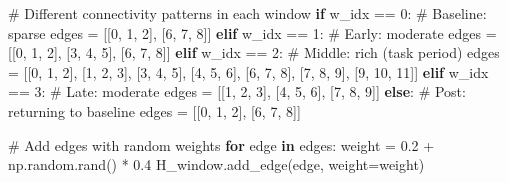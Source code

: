 \documentclass[
  11pt,
  letterpaper,
  oneside,
  openany]{book}
\newenvironment{Shaded}{\begin{snugshade}}{\end{snugshade}}
\newcommand{\CommentTok}[1]{\textcolor[rgb]{0.37,0.37,0.37}{#1}}
\newcommand{\ControlFlowTok}[1]{\textcolor[rgb]{0.00,0.23,0.31}{\textbf{#1}}}
\newcommand{\DecValTok}[1]{\textcolor[rgb]{0.68,0.00,0.00}{#1}}
\newcommand{\FloatTok}[1]{\textcolor[rgb]{0.68,0.00,0.00}{#1}}
\newcommand{\KeywordTok}[1]{\textcolor[rgb]{0.00,0.23,0.31}{\textbf{#1}}}
\newcommand{\NormalTok}[1]{\textcolor[rgb]{0.00,0.23,0.31}{#1}}
\newcommand{\OperatorTok}[1]{\textcolor[rgb]{0.37,0.37,0.37}{#1}}
\begin{document}
\begin{Shaded}
\begin{Highlighting}[]
    \CommentTok{\# Different connectivity patterns in each window}
    \ControlFlowTok{if}\NormalTok{ w\_idx }\OperatorTok{==} \DecValTok{0}\NormalTok{:  }\CommentTok{\# Baseline: sparse}
\NormalTok{        edges }\OperatorTok{=}\NormalTok{ [[}\DecValTok{0}\NormalTok{, }\DecValTok{1}\NormalTok{, }\DecValTok{2}\NormalTok{], [}\DecValTok{6}\NormalTok{, }\DecValTok{7}\NormalTok{, }\DecValTok{8}\NormalTok{]]}
    \ControlFlowTok{elif}\NormalTok{ w\_idx }\OperatorTok{==} \DecValTok{1}\NormalTok{:  }\CommentTok{\# Early: moderate}
\NormalTok{        edges }\OperatorTok{=}\NormalTok{ [[}\DecValTok{0}\NormalTok{, }\DecValTok{1}\NormalTok{, }\DecValTok{2}\NormalTok{], [}\DecValTok{3}\NormalTok{, }\DecValTok{4}\NormalTok{, }\DecValTok{5}\NormalTok{], [}\DecValTok{6}\NormalTok{, }\DecValTok{7}\NormalTok{, }\DecValTok{8}\NormalTok{]]}
    \ControlFlowTok{elif}\NormalTok{ w\_idx }\OperatorTok{==} \DecValTok{2}\NormalTok{:  }\CommentTok{\# Middle: rich (task period)}
\NormalTok{        edges }\OperatorTok{=}\NormalTok{ [[}\DecValTok{0}\NormalTok{, }\DecValTok{1}\NormalTok{, }\DecValTok{2}\NormalTok{], [}\DecValTok{1}\NormalTok{, }\DecValTok{2}\NormalTok{, }\DecValTok{3}\NormalTok{], [}\DecValTok{3}\NormalTok{, }\DecValTok{4}\NormalTok{, }\DecValTok{5}\NormalTok{], [}\DecValTok{4}\NormalTok{, }\DecValTok{5}\NormalTok{, }\DecValTok{6}\NormalTok{], }
\NormalTok{                [}\DecValTok{6}\NormalTok{, }\DecValTok{7}\NormalTok{, }\DecValTok{8}\NormalTok{], [}\DecValTok{7}\NormalTok{, }\DecValTok{8}\NormalTok{, }\DecValTok{9}\NormalTok{], [}\DecValTok{9}\NormalTok{, }\DecValTok{10}\NormalTok{, }\DecValTok{11}\NormalTok{]]}
    \ControlFlowTok{elif}\NormalTok{ w\_idx }\OperatorTok{==} \DecValTok{3}\NormalTok{:  }\CommentTok{\# Late: moderate  }
\NormalTok{        edges }\OperatorTok{=}\NormalTok{ [[}\DecValTok{1}\NormalTok{, }\DecValTok{2}\NormalTok{, }\DecValTok{3}\NormalTok{], [}\DecValTok{4}\NormalTok{, }\DecValTok{5}\NormalTok{, }\DecValTok{6}\NormalTok{], [}\DecValTok{7}\NormalTok{, }\DecValTok{8}\NormalTok{, }\DecValTok{9}\NormalTok{]]}
    \ControlFlowTok{else}\NormalTok{:  }\CommentTok{\# Post: returning to baseline}
\NormalTok{        edges }\OperatorTok{=}\NormalTok{ [[}\DecValTok{0}\NormalTok{, }\DecValTok{1}\NormalTok{, }\DecValTok{2}\NormalTok{], [}\DecValTok{6}\NormalTok{, }\DecValTok{7}\NormalTok{, }\DecValTok{8}\NormalTok{]]}
    
    \CommentTok{\# Add edges with random weights}
    \ControlFlowTok{for}\NormalTok{ edge }\KeywordTok{in}\NormalTok{ edges:}
\NormalTok{        weight }\OperatorTok{=} \FloatTok{0.2} \OperatorTok{+}\NormalTok{ np.random.rand() }\OperatorTok{*} \FloatTok{0.4}
\NormalTok{        H\_window.add\_edge(edge, weight}\OperatorTok{=}\NormalTok{weight)}
    

\end{Highlighting}
\end{Shaded}
\end{document}
